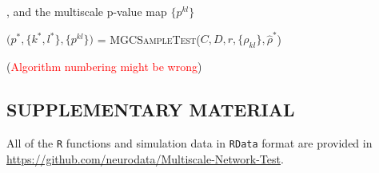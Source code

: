 \documentclass[11pt]{article}
\theoremstyle{definition}
\begin{document}
\begin{algorithm}
\begin{algorithmic}[1]
		, and the multiscale p-value map $\{  p^{kl} \}$ 
				
			
			\State $\big(  p^{*}, \{  k^{*}, l^{*}  \}, \{ p^{kl} \}   \big)$ = \textsc{MGCSampleTest}($C, D, r, \{  \rho_{kl} \}, \hat{\rho}^{*}$) 
			

			\EndFunction
	
		\end{algorithmic}
	\end{algorithm}
	(\textcolor{red}{Algorithm numbering might be wrong})
	

	\newpage
	\subsection*{SUPPLEMENTARY MATERIAL}
	
	All of the \texttt{R} functions and simulation data in \texttt{RData} format are provided in \url{https://github.com/neurodata/Multiscale-Network-Test}.
	
	
\end{document}
